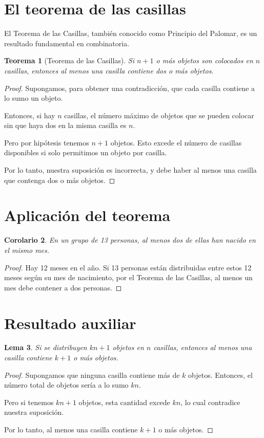 \documentclass{article}
\theoremstyle{plain}
\newtheorem{theorem}{Teorema}[section]
\newtheorem{corollary}[theorem]{Corolario}
\newtheorem{lemma}[theorem]{Lema}
\begin{document}
\section{El teorema de las casillas}

El Teorema de las Casillas, también conocido como Principio del Palomar, es un resultado fundamental en combinatoria.

\begin{theorem}[Teorema de las Casillas]
Si \( n+1 \) o más objetos son colocados en \( n \) casillas, entonces al menos una casilla contiene dos o más objetos.
\end{theorem}

\begin{proof}
Supongamos, para obtener una contradicción, que cada casilla contiene a lo sumo un objeto.

Entonces, si hay \( n \) casillas, el número máximo de objetos que se pueden colocar sin que haya dos en la misma casilla es \( n \).

Pero por hipótesis tenemos \( n+1 \) objetos. Esto excede el número de casillas disponibles si solo permitimos un objeto por casilla.

Por lo tanto, nuestra suposición es incorrecta, y debe haber al menos una casilla que contenga dos o más objetos.
\end{proof}

\section{Aplicación del teorema}

\begin{corollary}
En un grupo de 13 personas, al menos dos de ellas han nacido en el mismo mes.
\end{corollary}

\begin{proof}
Hay 12 meses en el año. Si 13 personas están distribuidas entre estos 12 meses según su mes de nacimiento, por el Teorema de las Casillas, al menos un mes debe contener a dos personas.
\end{proof}

\section{Resultado auxiliar}

\begin{lemma}
Si se distribuyen \( kn + 1 \) objetos en \( n \) casillas, entonces al menos una casilla contiene \( k+1 \) o más objetos.
\end{lemma}

\begin{proof}
Supongamos que ninguna casilla contiene más de \( k \) objetos. Entonces, el número total de objetos sería a lo sumo \( kn \).

Pero si tenemos \( kn + 1 \) objetos, esta cantidad excede \( kn \), lo cual contradice nuestra suposición.

Por lo tanto, al menos una casilla contiene \( k+1 \) o más objetos.
\end{proof}
\end{document}
